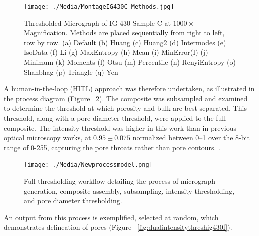 \documentclass[review]{elsarticle}
\begin{document}
	\begin{figure}[!htbp]
		\centering
		\texttt{[image: ./Media/MontageIG430C Methods.jpg]}
		\caption{Thresholded Micrograph of IG-430 Sample C at $1000\times$ Magnification. Methods are placed sequentially from right to left, row by row. 
      (a) Default
			(b) Huang
			(c) Huang2
			(d) Intermodes
			(e) IsoData
			(f) Li
			(g) MaxEntropy
			(h) Mean
			(i) MinError(I)
			(j) Minimum
			(k) Moments
			(l) Otsu
			(m) Percentile
			(n) RenyiEntropy
			(o) Shanbhag
			(p) Triangle
			(q) Yen}
		\label{fig:Try All Thresholding Methods}
	\end{figure}  

	A human-in-the-loop (HITL) approach was therefore undertaken, as illustrated
	in the process diagram (Figure ~\ref{fig:Final Workflow}). The composite was
	subsampled and examined to determine the threshold at which porosity and bulk
	are best separated. This threshold, along with a pore diameter threshold, were
	applied to the full composite. The intensity threshold was higher in this work
	than in previous optical microscopy works, at $0.95 \pm 0.075$
	normalized between 0--1 over the 8-bit range of 0-255, capturing the pore
	throats rather than pore contours. \citep{Kane2011a,Huang2019}.


\begin{figure}[!htbp]
    \centering
    \texttt{[image: ./Media/Newprocessmodel.png]}
    \caption{Full thresholding workflow detailing the process of micrograph generation,
     composite assembly, subsampling, intensity thresholding, and pore diameter thresholding.}
    \label{fig:Final Workflow}
\end{figure}

An output from this process is exemplified, selected at random, which
demonstrates delineation of pores (Figure ~\ref{fig:dualintensitythreshig430f}).
\end{document}
